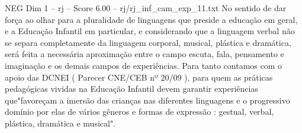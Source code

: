 \begin{textsample}{NEG Dim 1 – rj – Score 6.00 – rj/rj\_inf\_cam\_exp\_11.txt}
No sentido de dar força ao olhar para a pluralidade de linguagens que preside a educação em geral, e a Educação Infantil em particular, e considerando que a linguagem verbal não se separa completamente da linguagem corporal, musical, plástica e dramática, será feita a necessária aproximação entre o campo escuta, fala, pensamento e imaginação e os demais campos de experiências.
Para tanto contamos com o apoio das DCNEI ( Parecer CNE/CEB nº 20/09 ), para quem as práticas pedagógicas vividas na Educação Infantil devem garantir experiências que"favoreçam a imersão das crianças nas diferentes linguagens e o progressivo domínio por elas de vários gêneros e formas de expressão : gestual, verbal, plástica, dramática e musical".

\end{textsample}
